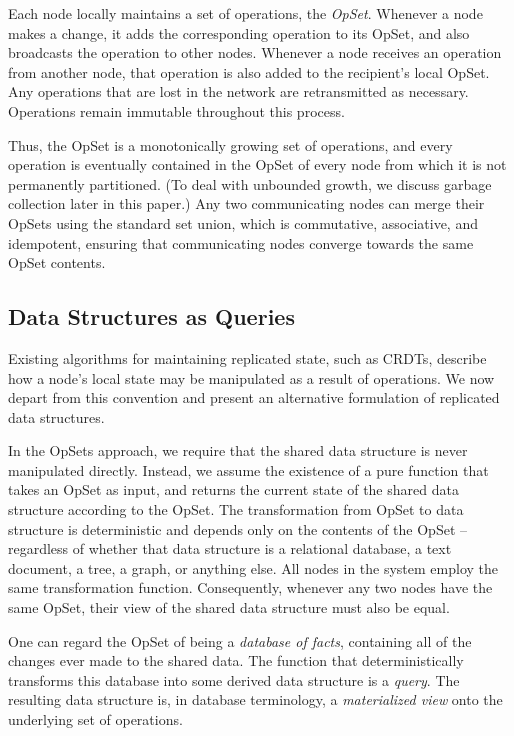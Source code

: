 Each node locally maintains a set of operations, the \emph{OpSet}.
Whenever a node makes a change, it adds the corresponding operation to its OpSet, and also broadcasts the operation to other nodes.
Whenever a node receives an operation from another node, that operation is also added to the recipient's local OpSet.
Any operations that are lost in the network are retransmitted as necessary.
Operations remain immutable throughout this process.

Thus, the OpSet is a monotonically growing set of operations, and every operation is eventually contained in the OpSet of every node from which it is not permanently partitioned.
(To deal with unbounded growth, we discuss garbage collection later in this paper.)
Any two communicating nodes can merge their OpSets using the standard set union, which is commutative, associative, and idempotent, ensuring that communicating nodes converge towards the same OpSet contents.

\subsection{Data Structures as Queries}\label{sec:queries}

Existing algorithms for maintaining replicated state, such as CRDTs, describe how a node's local state may be manipulated as a result of operations.
We now depart from this convention and present an alternative formulation of replicated data structures.

In the OpSets approach, we require that the shared data structure is never manipulated directly.
Instead, we assume the existence of a pure function that takes an OpSet as input, and returns the current state of the shared data structure according to the OpSet.
The transformation from OpSet to data structure is deterministic and depends only on the contents of the OpSet -- regardless of whether that data structure is a relational database, a text document, a tree, a graph, or anything else.
All nodes in the system employ the same transformation function.
Consequently, whenever any two nodes have the same OpSet, their view of the shared data structure must also be equal.

One can regard the OpSet of being a \emph{database of facts}, containing all of the changes ever made to the shared data.
The function that deterministically transforms this database into some derived data structure is a \emph{query}.
The resulting data structure is, in database terminology, a \emph{materialized view} onto the underlying set of operations.

